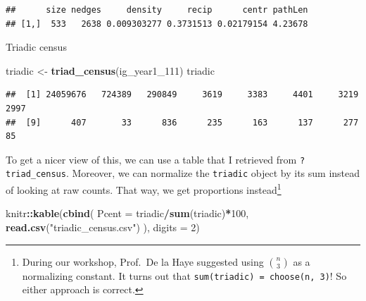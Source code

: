 \documentclass[]{book}
\newenvironment{Shaded}{\begin{snugshade}}{\end{snugshade}}
\newcommand{\DataTypeTok}[1]{\textcolor[rgb]{0.13,0.29,0.53}{#1}}
\newcommand{\DecValTok}[1]{\textcolor[rgb]{0.00,0.00,0.81}{#1}}
\newcommand{\KeywordTok}[1]{\textcolor[rgb]{0.13,0.29,0.53}{\textbf{#1}}}
\newcommand{\NormalTok}[1]{#1}
\newcommand{\OperatorTok}[1]{\textcolor[rgb]{0.81,0.36,0.00}{\textbf{#1}}}
\newcommand{\StringTok}[1]{\textcolor[rgb]{0.31,0.60,0.02}{#1}}
\begin{document}
\begin{verbatim}
##      size nedges     density     recip      centr pathLen
## [1,]  533   2638 0.009303277 0.3731513 0.02179154 4.23678
\end{verbatim}

Triadic census

\begin{Shaded}
\begin{Highlighting}[]
\NormalTok{triadic <-}\StringTok{ }\KeywordTok{triad_census}\NormalTok{(ig_year1_}\DecValTok{111}\NormalTok{)}
\NormalTok{triadic}
\end{Highlighting}
\end{Shaded}

\begin{verbatim}
##  [1] 24059676   724389   290849     3619     3383     4401     3219     2997
##  [9]      407       33      836      235      163      137      277       85
\end{verbatim}

To get a nicer view of this, we can use a table that I retrieved from \texttt{?triad\_census}. Moreover, we can normalize the \texttt{triadic} object by its sum instead of looking at raw counts. That way, we get proportions instead\footnote{During our workshop, Prof.~De la Haye suggested using \({n \choose 3}\) as a normalizing constant. It turns out that \texttt{sum(triadic)\ =\ choose(n,\ 3)}! So either approach is correct.}

\begin{Shaded}
\begin{Highlighting}[]
\NormalTok{knitr}\OperatorTok{::}\KeywordTok{kable}\NormalTok{(}\KeywordTok{cbind}\NormalTok{(}
  \DataTypeTok{Pcent =}\NormalTok{ triadic}\OperatorTok{/}\KeywordTok{sum}\NormalTok{(triadic)}\OperatorTok{*}\DecValTok{100}\NormalTok{,}
  \KeywordTok{read.csv}\NormalTok{(}\StringTok{"triadic_census.csv"}\NormalTok{)}
\NormalTok{  ), }\DataTypeTok{digits =} \DecValTok{2}\NormalTok{)}
\end{Highlighting}
\end{Shaded}
\end{document}
